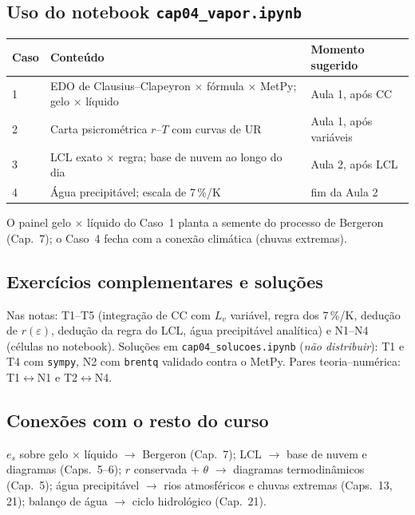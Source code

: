 \subsection*{Uso do notebook \texttt{cap04\_vapor.ipynb}}

\begin{center}
\begin{tabular}{lll}
\hline
Caso & Conteúdo & Momento sugerido \\
\hline
1 & EDO de Clausius--Clapeyron × fórmula × MetPy; gelo × líquido & Aula 1, após CC \\
2 & Carta psicrométrica $r$--$T$ com curvas de UR & Aula 1, após variáveis \\
3 & LCL exato × regra; base de nuvem ao longo do dia & Aula 2, após LCL \\
4 & Água precipitável; escala de 7\,\%/K & fim da Aula 2 \\
\hline
\end{tabular}
\end{center}

O painel gelo × líquido do Caso~1 planta a semente do processo de Bergeron
(Cap.~7); o Caso~4 fecha com a conexão climática (chuvas extremas).

\subsection*{Exercícios complementares e soluções}

Nas notas: T1--T5 (integração de CC com $L_v$ variável, regra dos 7\,\%/K,
dedução de $r(\varepsilon)$, dedução da regra do LCL, água precipitável
analítica) e N1--N4 (células no notebook). Soluções em
\texttt{cap04\_solucoes.ipynb} (\emph{não distribuir}): T1 e T4 com
\texttt{sympy}, N2 com \texttt{brentq} validado contra o MetPy.
Pares teoria--numérica: T1$\leftrightarrow$N1 e T2$\leftrightarrow$N4.

\subsection*{Conexões com o resto do curso}

$e_s$ sobre gelo × líquido $\to$ Bergeron (Cap.~7); LCL $\to$ base de nuvem
e diagramas (Caps.~5--6); $r$ conservada + $\theta$ $\to$ diagramas
termodinâmicos (Cap.~5); água precipitável $\to$ rios atmosféricos e chuvas
extremas (Caps.~13, 21); balanço de água $\to$ ciclo hidrológico (Cap.~21).
